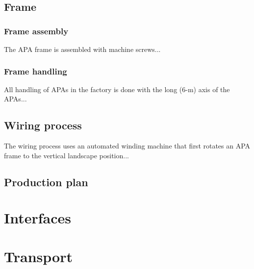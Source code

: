 \subsection{Frame}

\subsubsection{Frame assembly}
\label{sec:apa-fabric-frame}

The APA frame is assembled with machine screws...

\subsubsection{Frame handling}
\label{sec:apa-fabric-fr-handling}

All handling of APAs in the factory is done with the long (6-m) axis of the APAs...

\subsection{Wiring process}
\label{sec:apa-wiring}
The wiring process uses an automated winding machine that first rotates an APA frame to the vertical landscape position...

\subsection{Production plan}


\section{Interfaces}
\label{sec:apa-interfaces}


\section{Transport}
\label{sec:apa-transport}


